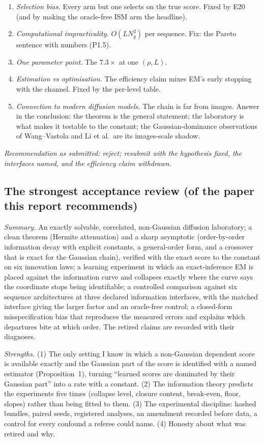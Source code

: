 \begin{enumerate}
\item \emph{Selection bias.} Every arm but one selects on the true score.  Fixed by E20 (and by making the oracle-free ISM arm the headline).
\item \emph{Computational impracticality.} $O(LN_g^2)$ per sequence.  Fix: the Pareto sentence with numbers (P1.5).
\item \emph{One parameter point.} The $7.3\times$ at one $(\rho,L)$. 
\item \emph{Estimation vs optimisation.} The efficiency claim mixes EM's early stopping with the channel.  Fixed by the per-level table.
\item \emph{Connection to modern diffusion models.} The chain is far from images.  Answer in the conclusion: the theorem is the general statement; the laboratory is what makes it testable to the constant; the Gaussian-dominance observations of Wang--Vastola and Li et al.\ are its images-scale shadow.
\end{enumerate}
\emph{Recommendation as submitted: reject; resubmit with the hypothesis fixed, the interfaces named, and the efficiency claim withdrawn.}

\subsection{The strongest acceptance review (of the paper this report recommends)}

\emph{Summary.} An exactly solvable, correlated, non-Gaussian diffusion laboratory; a clean theorem (Hermite attenuation) and a sharp asymptotic (order-by-order information decay with explicit constants, a general-order form, and a crossover that is exact for the Gaussian chain), verified with the exact score to the constant on six innovation laws; a learning experiment in which an exact-inference EM is placed against the information curve and collapses exactly where the curve says the coordinate stops being identifiable; a controlled comparison against six sequence architectures at three declared information interfaces, with the matched interface giving the larger factor and an oracle-free control; a closed-form misspecification bias that reproduces the measured errors and explains which departures bite at which order. The retired claims are recorded with their diagnoses.

\emph{Strengths.} (1) The only setting I know in which a non-Gaussian dependent score is available exactly and the Gaussian part of the score is identified with a named estimator (Proposition~1), turning ``learned scores are dominated by their Gaussian part'' into a rate with a constant. (2) The information theory predicts the experiments five times (collapse level, closure content, break-even, floor, slopes) rather than being fitted to them. (3) The experimental discipline: hashed bundles, paired seeds, registered analyses, an amendment recorded before data, a control for every confound a referee could name. (4) Honesty about what was retired and why.

